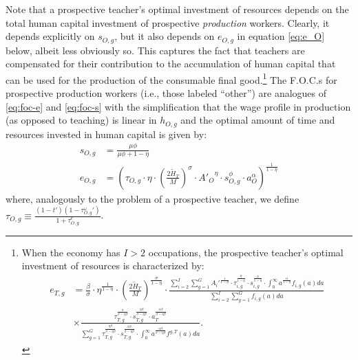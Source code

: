 \documentclass[onehalfspacing,11pt]{article}
\begin{document}
Note that a prospective teacher's optimal investment of resources depends on the total human capital investment of prospective {\it production} workers. Clearly, it depends explicitly on $s_{O,g}$, but it also depends on $e_{O,g}$ in equation \eqref{eq:e_O} below, albeit less obviously so. This captures the fact that teachers are compensated for their contribution to the accumulation of human capital that can be used for the production of the consumable final good.\footnote{When the economy has $I>2$ occupations, the prospective teacher's optimal investment of resources is characterized by:
\begin{align*}
e_{T,g} & = \tfrac{\beta}{\sigma}\cdot\eta^{\frac{1}{1-\eta}}\cdot \left(\tfrac{2\widetilde{H}_T}{M}\right)^{\frac{\sigma}{1-\eta}} \cdot \frac{\sum_{i=2}^I \sum_{g=1}^G {A_i'}^\frac{1}{1-\eta}\cdot\tau_{i,g}^\frac{\eta}{1-\eta} \cdot s_{i,g}^\frac{\phi}{1-\eta}\cdot \int_0^\infty a^{\frac{\alpha}{1-\eta}} f_{i,g}(a)da}{\sum_{i=2}^I \sum_{g=1}^G f_{i,g}(a)da} \nonumber\\
& \times \frac{\tau_{T,g}^\frac{\sigma}{\sigma-\eta\beta } \cdot s_{T,g}^\frac{\phi\beta }{\sigma-\eta\beta } \cdot a_T^\frac{\alpha\beta }{\sigma-\eta\beta }}{\sum_{g=1}^G \tau_{T,g}^\frac{\eta\beta }{\sigma-\eta\beta } \cdot s_{T,g}^\frac{\phi\beta }{\sigma-\eta\beta } \cdot \int_0^\infty a^\frac{\alpha\beta}{\sigma-\eta\beta } f^{g,T}(a)da}.
\end{align*}
}
The F.O.C.s for prospective production workers (i.e., those labeled ``other'') are analogues of \eqref{eq:foc-e} and \eqref{eq:foc-s} with the simplification that the wage profile in production (as opposed to teaching) is linear in $h_{O,g}$ and the optimal amount of time and resources invested in human capital is given by:
\begin{align}
s_{O,g} & = \frac{\mu \phi}{\mu \phi+1-\eta} \\
\label{eq:e_O}
e_{O,g} & = \left( \tau_{O,g} \cdot \eta \cdot \left(\tfrac{2\widetilde{H}_T}{M}\right)^\sigma\cdot {A'_{O}}^\eta \cdot s_{O,g}^\phi \cdot a_O^\alpha \right)^{\frac{1}{1-\eta}}
\end{align}
where, analogously to the problem of a prospective teacher, we define $\tau_{O,g} \equiv \frac{\left( 1-t' \right) \left( 1-\tau^\omega_{O,g}' \right)}{1+\tau^e_{O,g}}$.
\end{document}

